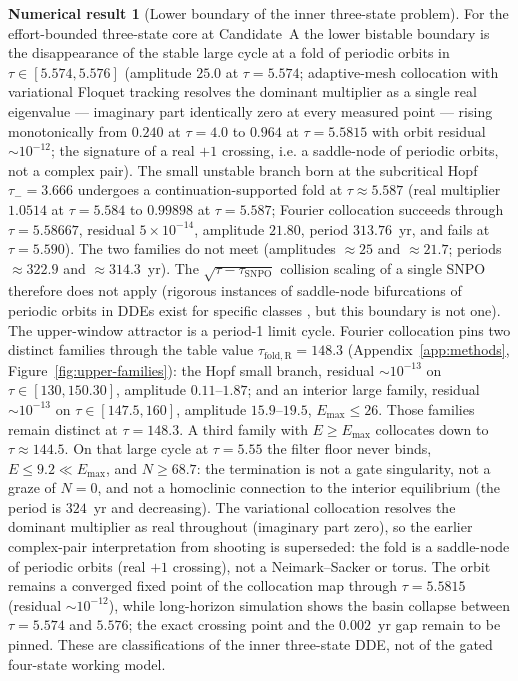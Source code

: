 \documentclass[11pt]{article}
\theoremstyle{definition}
\newtheorem{numresult}{Numerical result}
\begin{document}
\begin{numresult}[Lower boundary of the inner three-state problem]
\label{thm:two-folds}
For the effort-bounded three-state core at Candidate~A the lower bistable boundary is the disappearance of the stable large cycle at a fold of periodic orbits in $\tau\in[5.574,5.576]$ (amplitude $25.0$ at $\tau=5.574$; adaptive-mesh collocation with variational Floquet tracking resolves the dominant multiplier as a single real eigenvalue --- imaginary part identically zero at every measured point --- rising monotonically from $0.240$ at $\tau=4.0$ to $0.964$ at $\tau=5.5815$ with orbit residual $\sim10^{-12}$; the signature of a real $+1$ crossing, i.e. a saddle-node of periodic orbits, not a complex pair). The small unstable branch born at the subcritical Hopf $\tau_-=3.666$ undergoes a continuation-supported fold at $\tau\approx 5.587$ (real multiplier $1.0514$ at $\tau=5.584$ to $0.99898$ at $\tau=5.587$; Fourier collocation succeeds through $\tau=5.58667$, residual $5\times 10^{-14}$, amplitude $21.80$, period $313.76$~yr, and fails at $\tau=5.590$). The two families do not meet (amplitudes $\approx 25$ and $\approx 21.7$; periods $\approx 322.9$ and $\approx 314.3$~yr). The $\sqrt{\tau-\tau_{\mathrm{SNPO}}}$ collision scaling of a single SNPO therefore does not apply (rigorous instances of saddle-node bifurcations of periodic orbits in DDEs exist for specific classes \cite{beretka2020}, but this boundary is not one). The upper-window attractor is a period-1 limit cycle. Fourier collocation pins two distinct families through the table value $\tau_{\mathrm{fold,R}}=148.3$ (Appendix~\ref{app:methods}, Figure~\ref{fig:upper-families}): the Hopf small branch, residual $\sim 10^{-13}$ on $\tau\in[130,150.30]$, amplitude $0.11$--$1.87$; and an interior large family, residual $\sim 10^{-13}$ on $\tau\in[147.5,160]$, amplitude $15.9$--$19.5$, $E_{\max}\le 26$. Those families remain distinct at $\tau=148.3$. A third family with $E\ge E_{\max}$ collocates down to $\tau\approx 144.5$. On that large cycle at $\tau=5.55$ the filter floor never binds, $E\le 9.2\ll E_{\max}$, and $N\ge 68.7$: the termination is not a gate singularity, not a graze of $N=0$, and not a homoclinic connection to the interior equilibrium (the period is $324$~yr and decreasing). The variational collocation resolves the dominant multiplier as real throughout (imaginary part zero), so the earlier complex-pair interpretation from shooting is superseded: the fold is a saddle-node of periodic orbits (real $+1$ crossing), not a Neimark--Sacker or torus. The orbit remains a converged fixed point of the collocation map through $\tau=5.5815$ (residual $\sim10^{-12}$), while long-horizon simulation shows the basin collapse between $\tau=5.574$ and $5.576$; the exact crossing point and the $0.002$~yr gap remain to be pinned. These are classifications of the inner three-state DDE, not of the gated four-state working model.
\end{numresult}
\end{document}
